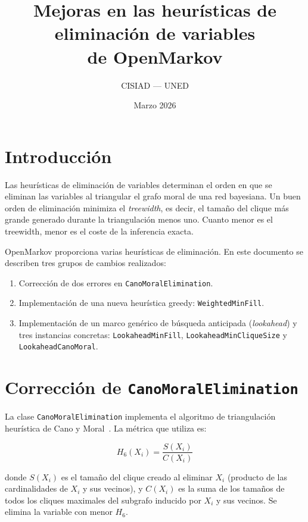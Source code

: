 \documentclass[11pt, a4paper]{article}
\title{Mejoras en las heurísticas de eliminación de variables\\
       de OpenMarkov}
\author{CISIAD --- UNED}
\date{Marzo 2026}
\begin{document}
\maketitle
\tableofcontents
\bigskip\bigskip

\section{Introducción}

Las heurísticas de eliminación de variables determinan el orden en que se eliminan las variables al triangular el grafo moral de una red bayesiana. Un buen orden de eliminación minimiza el \emph{treewidth}, es decir, el tamaño del clique más grande generado durante la triangulación menos uno. Cuanto menor es el treewidth, menor es el coste de la inferencia exacta.

OpenMarkov proporciona varias heurísticas de eliminación. En este documento se describen tres grupos de cambios realizados:

\begin{enumerate}
  \item Corrección de dos errores en \texttt{CanoMoralElimination}.
  \item Implementación de una nueva heurística greedy: \texttt{WeightedMinFill}.
  \item Implementación de un marco genérico de búsqueda anticipada (\emph{lookahead}) y tres instancias concretas: \texttt{LookaheadMinFill}, \texttt{LookaheadMinCliqueSize} y \texttt{LookaheadCanoMoral}.
\end{enumerate}

\section{Corrección de \texttt{CanoMoralElimination}}
\label{sec:canomoral}

La clase \texttt{CanoMoralElimination} implementa el algoritmo de triangulación heurística de Cano y Moral~\cite{CanoMoral1991}. La métrica que utiliza es:

\begin{equation}
  H_6(X_i) = \frac{S(X_i)}{C(X_i)}
  \label{eq:h6}
\end{equation}

donde $S(X_i)$ es el tamaño del clique creado al eliminar $X_i$ (producto de las cardinalidades de $X_i$ y sus vecinos), y $C(X_i)$ es la suma de los tamaños de todos los cliques maximales del subgrafo inducido por $X_i$ y sus vecinos. Se elimina la variable con menor $H_6$.
\end{document}
